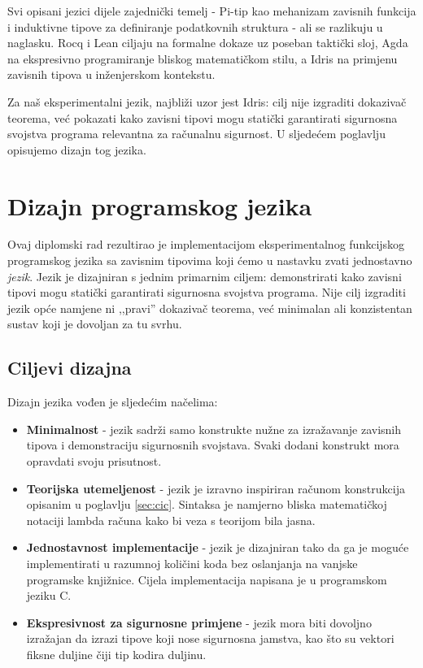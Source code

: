 \documentclass[diplomskirad,upload]{fer}
\begin{document}
Svi opisani jezici dijele zajednički temelj - Pi-tip kao mehanizam zavisnih
funkcija i induktivne tipove za definiranje podatkovnih struktura - ali se
razlikuju u naglasku. Rocq i Lean ciljaju na formalne dokaze uz poseban
taktički sloj, Agda na ekspresivno programiranje bliskog matematičkom stilu, a
Idris na primjenu zavisnih tipova u inženjerskom kontekstu.

Za naš eksperimentalni jezik, najbliži uzor jest Idris: cilj nije izgraditi
dokazivač teorema, već pokazati kako zavisni tipovi mogu statički
garantirati sigurnosna svojstva programa relevantna za računalnu sigurnost. U
sljedećem poglavlju opisujemo dizajn tog jezika.

\chapter{Dizajn programskog jezika}

Ovaj diplomski rad rezultirao je implementacijom eksperimentalnog funkcijskog
programskog jezika sa zavisnim tipovima koji ćemo u nastavku zvati jednostavno
\emph{jezik}. Jezik je dizajniran s jednim primarnim ciljem: demonstrirati kako
zavisni tipovi mogu statički garantirati sigurnosna svojstva programa. Nije
cilj izgraditi jezik opće namjene ni ,,pravi'' dokazivač teorema, već
minimalan ali konzistentan sustav koji je dovoljan za tu svrhu.

\section{Ciljevi dizajna}

Dizajn jezika vođen je sljedećim načelima:

\begin{itemize}
    \item \textbf{Minimalnost} - jezik sadrži samo konstrukte nužne za
    izražavanje zavisnih tipova i demonstraciju sigurnosnih svojstava. Svaki
    dodani konstrukt mora opravdati svoju prisutnost.

    \item \textbf{Teorijska utemeljenost} - jezik je izravno inspiriran računom
    konstrukcija opisanim u poglavlju \ref{sec:cic}. Sintaksa je namjerno bliska
    matematičkoj notaciji lambda računa kako bi veza s teorijom bila jasna.

    \item \textbf{Jednostavnost implementacije} - jezik je dizajniran tako da ga
    je moguće implementirati u razumnoj količini koda bez oslanjanja na vanjske
    programske knjižnice. Cijela implementacija napisana je u programskom jeziku C.

    \item \textbf{Ekspresivnost za sigurnosne primjene} - jezik mora biti
    dovoljno izražajan da izrazi tipove koji nose sigurnosna jamstva, kao što
    su vektori fiksne duljine čiji tip kodira duljinu.
\end{itemize}
\end{document}
